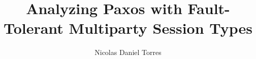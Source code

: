 \documentclass[
    english,
    ruledheaders=section,
    class=report,
    thesis={type=bachelor},
    accentcolor=1b,
    custommargins=true,
    marginpar=false,
    parskip=half-,
    fontsize=11pt,
    pdfa=false,
]{tudapub}
\begin{document}
\title{Analyzing Paxos with Fault-Tolerant Multiparty Session Types}
\author[N. D. Torres]{Nicolas Daniel Torres}
\submissiondate{\today}
\examdate{\today}
\maketitle
\tableofcontents










\printbibliography
\end{document}
